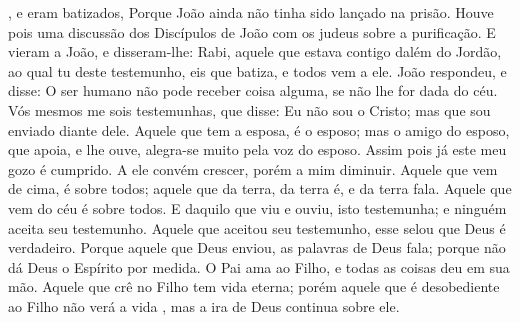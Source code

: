 {{},  e eram batizados,
  Porque João ainda não tinha sido lançado na prisão.
  Houve pois uma discussão dos Discípulos de João com os judeus sobre a purificação.
  E vieram a João, e disseram-lhe: Rabi, aquele que estava contigo dalém do Jordão, ao qual tu deste testemunho, eis que batiza, e todos vem a ele.
  João respondeu, e disse: O ser humano não pode receber coisa alguma, se não lhe for dada do céu.
  Vós mesmos me sois testemunhas, que disse: Eu não sou o Cristo; mas que sou enviado diante dele.
  Aquele que tem a esposa, é o esposo; mas o amigo do esposo, que
{} apoia, e lhe ouve, alegra-se muito pela voz do esposo. Assim pois já este meu gozo é cumprido.
  A ele convém crescer, porém a mim diminuir.
  Aquele que vem de cima, é sobre todos; aquele que
{} da terra, da terra é, e da terra fala. Aquele que vem do céu é sobre todos.
  E daquilo que viu e ouviu, isto testemunha; e ninguém aceita seu testemunho.
  Aquele que aceitou seu testemunho, esse selou que Deus é verdadeiro.
  Porque aquele que Deus enviou, as palavras de Deus fala; porque não
{} dá Deus o Espírito por medida.
  O Pai ama ao Filho, e todas as coisas
{} deu em sua mão.
  Aquele que crê no Filho tem vida eterna; porém aquele que é desobediente ao Filho não verá a vida
{},  mas a ira de Deus continua sobre ele.
\par }

